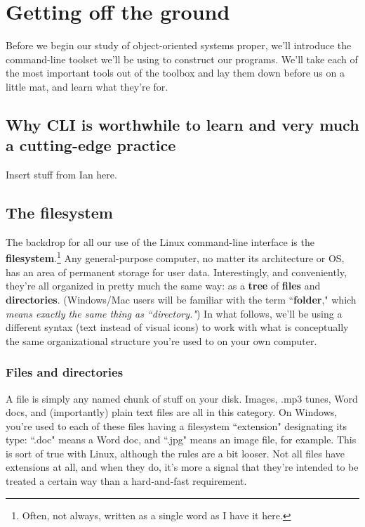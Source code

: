 
\chapter{Getting off the ground}
\label{ch:gettingOff}

Before we begin our study of object-oriented systems proper, we'll introduce
the command-line toolset we'll be using to construct our programs. We'll take
each of the most important tools out of the toolbox and lay them down before
us on a little mat, and learn what they're for.

\section{Why CLI is worthwhile to learn and very much a cutting-edge practice}

Insert stuff from Ian here.

\section{The filesystem}

The backdrop for all our use of the Linux command-line interface is the
\textbf{filesystem}.\footnote{Often, not always, written as a single word as I
have it here.} Any general-purpose computer, no matter its architecture or OS,
has an area of permanent storage for user data. Interestingly, and
conveniently, they're all organized in pretty much the same way: as a
\textbf{tree} of \textbf{files} and \textbf{directories}. (Windows/Mac users
will be familiar with the term ``\textbf{folder}," which \textit{means exactly
the same thing as ``directory."}) In what follows, we'll be using a different
syntax (text instead of visual icons) to work with what is conceptually the
same organizational structure you're used to on your own computer.

\subsection{Files and directories}

A file is simply any named chunk of stuff on your disk. Images, .mp3 tunes,
Word docs, and (importantly) plain text files are all in this category. On
Windows, you're used to each of these files having a filesystem ``extension"
designating its type: ``.doc" means a Word doc, and ``.jpg" means an image
file, for example. This is sort of true with Linux, although the rules are
a bit looser. Not all files have extensions at all, and when they do, it's
more a signal that they're intended to be treated a certain way than a
hard-and-fast requirement.


